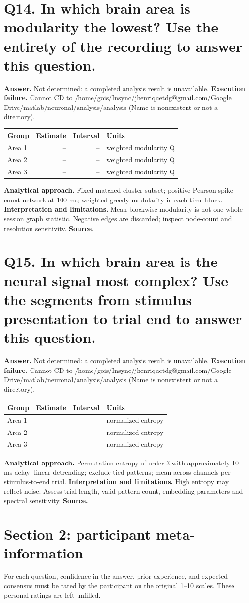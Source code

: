 \documentclass[11pt,a4paper]{article}
\begin{document}
\section*{Q14. In which brain area is modularity the lowest? Use the entirety of the recording to answer this question.}
\textbf{Answer.} Not determined: a completed analysis result is unavailable.
\textbf{Execution failure.} Cannot CD to /home/gois/Insync/jhenriquetdg@gmail.com/Google Drive/matlab/neuronal/analysis/analysis (Name is nonexistent or not a directory).
\begin{tabularx}{\linewidth}{XrrX}\toprule Group & Estimate & Interval & Units \\\midrule
Area 1 & -- & -- & weighted modularity Q \\
Area 2 & -- & -- & weighted modularity Q \\
Area 3 & -- & -- & weighted modularity Q \\
\bottomrule\end{tabularx}
\textbf{Analytical approach.} Fixed matched cluster subset; positive Pearson spike-count network at 100 ms; weighted greedy modularity in each time block.
\textbf{Interpretation and limitations.} Mean blockwise modularity is not one whole-session graph statistic. Negative edges are discarded; inspect node-count and resolution sensitivity.
\textbf{Source.} 
\clearpage
\section*{Q15. In which brain area is the neural signal most complex? Use the segments from stimulus presentation to trial end to answer this question.}
\textbf{Answer.} Not determined: a completed analysis result is unavailable.
\textbf{Execution failure.} Cannot CD to /home/gois/Insync/jhenriquetdg@gmail.com/Google Drive/matlab/neuronal/analysis/analysis (Name is nonexistent or not a directory).
\begin{tabularx}{\linewidth}{XrrX}\toprule Group & Estimate & Interval & Units \\\midrule
Area 1 & -- & -- & normalized entropy \\
Area 2 & -- & -- & normalized entropy \\
Area 3 & -- & -- & normalized entropy \\
\bottomrule\end{tabularx}
\textbf{Analytical approach.} Permutation entropy of order 3 with approximately 10 ms delay; linear detrending; exclude tied patterns; mean across channels per stimulus-to-end trial.
\textbf{Interpretation and limitations.} High entropy may reflect noise. Assess trial length, valid pattern count, embedding parameters and spectral sensitivity.
\textbf{Source.} 
\clearpage\section*{Section 2: participant meta-information}
For each question, confidence in the answer, prior experience, and expected consensus must be rated by the participant on the original 1--10 scales. These personal ratings are left unfilled.
\end{document}
